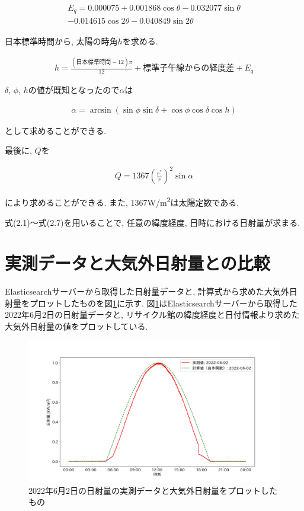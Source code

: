 \begin{eqnarray}
  \begin{split}
    E_q =  0.000075+0.001868\cos \theta-0.032077\sin \theta\\
    -0.014615\cos 2\theta-0.040849\sin 2\theta
  \end{split}
\end{eqnarray}

日本標準時間から, 太陽の時角$h$を求める.

\begin{eqnarray}
  h = \frac{(日本標準時間-12)\pi}{12}+標準子午線からの経度差+E_q
\end{eqnarray}

$\delta$, $\phi$, $h$の値が既知となったので$\alpha$は

\begin{eqnarray}
  \alpha = \arcsin (\sin \phi\sin \delta+\cos \phi\cos \delta\cos h)
\end{eqnarray}

として求めることができる.

最後に, $Q$を

\begin{eqnarray}
  Q = 1367(\frac{r^{*}}{r})^{2}\sin \alpha
\end{eqnarray}

により求めることができる.
また, 1367\si{\watt}/\si{\metre\squared}は太陽定数である.

式(2.1)～式(2.7)を用いることで, 任意の緯度経度, 日時における日射量が求まる.


\section{実測データと大気外日射量との比較}
Elasticsearchサーバーから取得した日射量データと, 計算式から求めた大気外日射量をプロットしたものを図\ref{20220529-p1}に示す.
図\ref{20220529-p1}はElasticsearchサーバーから取得した2022年6月2日の日射量データと, リサイクル館の緯度経度と日付情報より求めた大気外日射量の値をプロットしている.

\begin{figure}[h]
  \begin{center}
    \includegraphics[width=160mm]{sotu/figure/2/original-20220602-corr.png}
    \caption{2022年6月2日の日射量の実測データと大気外日射量をプロットしたもの}
    \label{20220529-p1}
  \end{center}
\end{figure}

